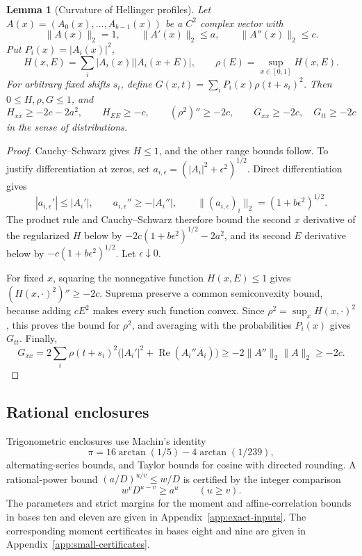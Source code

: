 \documentclass[11pt,a4paper]{article}
\theoremstyle{paperplain}
\newtheorem{lemma}[theorem]{Lemma}
\numberwithin{equation}{section}
\begin{document}
\begin{lemma}[Curvature of Hellinger profiles]\label{prelim:hellinger-curvature}
Let $A(x)=(A_0(x),\ldots,A_{b-1}(x))$ be a $C^2$ complex vector with
\[
 \|A(x)\|_2=1,\qquad \|A'(x)\|_2\leqslant a,\qquad
 \|A''(x)\|_2\leqslant c.
\]
Put $P_i(x)=|A_i(x)|^2$,
\[
 H(x,E)=\sum_i|A_i(x)||A_i(x+E)|,\qquad
 \rho(E)=\sup_{x\in[0,1]}H(x,E).
\]
For arbitrary fixed shifts $s_i$, define
$G(x,t)=\sum_iP_i(x)\rho(t+s_i)^2$. Then
$0\leqslant H,\rho,G\leqslant1$, and
\[
 H_{xx}\geqslant-2c-2a^2,\qquad H_{EE}\geqslant-c,\qquad
 (\rho^2)''\geqslant-2c,\qquad
 G_{xx}\geqslant-2c,\quad G_{tt}\geqslant-2c
\]
in the sense of distributions.
\end{lemma}
\begin{proof}
Cauchy--Schwarz gives $H\leqslant1$, and the other range bounds follow.
To justify differentiation at zeros, set
$a_{i,\epsilon}=(|A_i|^2+\epsilon^2)^{1/2}$. Direct differentiation gives
\[
 |a_{i,\epsilon}'|\leqslant|A_i'|,
 \qquad a_{i,\epsilon}''\geqslant-|A_i''|,
 \qquad \|(a_{i,\epsilon})_i\|_2=(1+b\epsilon^2)^{1/2}.
\]
The product rule and Cauchy--Schwarz therefore bound the second
$x$ derivative of the regularized $H$ below by
$-2c(1+b\epsilon^2)^{1/2}-2a^2$, and its second $E$ derivative below by
$-c(1+b\epsilon^2)^{1/2}$. Let $\epsilon\downarrow0$.

For fixed $x$, squaring the nonnegative function $H(x,E)\leqslant1$
gives $(H(x,\cdot)^2)''\geqslant-2c$. Suprema preserve a common
semiconvexity bound, because adding $cE^2$ makes every such function
convex. Since $\rho^2=\sup_x H(x,\cdot)^2$, this proves the bound for
$\rho^2$, and averaging with the probabilities $P_i(x)$ gives $G_{tt}$.
Finally,
\[
 G_{xx}
 =2\sum_i\rho(t+s_i)^2
       \bigl(|A_i'|^2+\operatorname{Re}(A_i''\overline{A_i})\bigr)
 \geqslant-2\|A''\|_2\|A\|_2\geqslant-2c.
\]
\end{proof}

\subsection{Rational enclosures}

Trigonometric enclosures use Machin's identity
\[
 \pi=16\arctan(1/5)-4\arctan(1/239),
\]
alternating-series bounds, and Taylor bounds for cosine with directed
rounding. A rational-power bound $(a/D)^{u/v}\leqslant w/D$ is certified
by the integer comparison
\begin{equation}\label{prelim:integer-power}
 w^vD^{u-v}\geqslant a^u\qquad(u\geqslant v).
\end{equation}
The parameters and strict margins for the moment and affine-correlation
bounds in bases ten and eleven are given in Appendix~\ref{app:exact-inputs}.
The corresponding moment certificates in bases eight and nine are given in
Appendix~\ref{app:small-certificates}.
\end{document}
